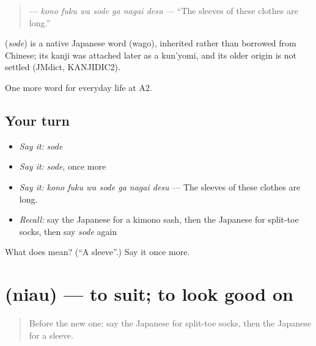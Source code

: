 \begin{quote}
\textbf{   } — \emph{kono fuku wa sode ga nagai desu} — \textquotedblleft{}The sleeves of these clothes are long.\textquotedblright{}
\end{quote}

\begin{cousinweb}
\textbf{} (\emph{sode}) is a native Japanese word (wago), inherited rather than borrowed from Chinese; its kanji was attached later as a kun'yomi, and its older origin is not settled (JMdict, KANJIDIC2).
\end{cousinweb}

\begin{grammarlens}[title={What you've built}]
One more word for everyday life at A2.
\end{grammarlens}

\subsection*{Your turn}
\begin{itemize}
\raggedright
  \item \emph{Say it:} \emph{sode}
  \item \emph{Say it:} \emph{sode}, once more
  \item \emph{Say it:} \emph{kono fuku wa sode ga nagai desu} — The sleeves of these clothes are long.
  \item \emph{Recall:} say the Japanese for a kimono sash, then the Japanese for split-toe socks, then say \emph{sode} again
\end{itemize}

\begin{tcolorbox}[breakable,colback=teal!4,colframe=teal!35!black,title={Before you move on}]
What does  mean? (\textquotedblleft{}A sleeve\textquotedblright{}.) Say it once more.
\end{tcolorbox}
\section[\texorpdfstring{\ja{にあう} (niau)}{にあう (niau)}]{ (niau) — to suit; to look good on}

\label{lesson:JA-C151-niau}



\begin{quote}
Before the new one: say the Japanese for split-toe socks, then the Japanese for a sleeve.
\end{quote}

